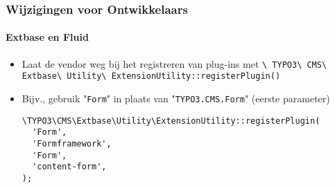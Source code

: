 \begin{frame}[fragile]
	\frametitle{Wijzigingen voor Ontwikkelaars}
	\framesubtitle{Extbase en Fluid}

	\lstset{basicstyle=\smaller\ttfamily}

	\begin{itemize}
		\item Laat de vendor weg bij het registreren van plug-ins met\newline
			\smaller
				\texttt{\textbackslash
					TYPO3\textbackslash
					CMS\textbackslash
					Extbase\textbackslash
					Utility\textbackslash
					ExtensionUtility::registerPlugin()}
			\normalsize

		\item Bijv., gebruik "\texttt{Form}" in plaats van "\texttt{TYPO3.CMS.Form}"\newline
			\small(eerste parameter)\normalsize

\begin{lstlisting}
\TYPO3\CMS\Extbase\Utility\ExtensionUtility::registerPlugin(
  'Form',
  'Formframework',
  'Form',
  'content-form',
);
\end{lstlisting}

	\end{itemize}

\end{frame}


